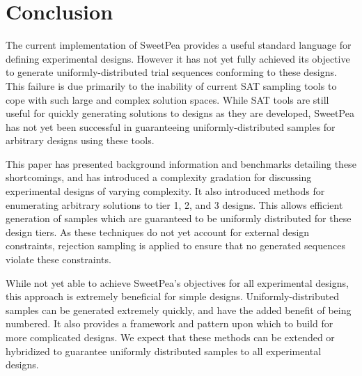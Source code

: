 
\chapter{Conclusion}

The current implementation of SweetPea provides a useful standard language for defining experimental designs. However it has not yet fully achieved its objective to generate uniformly-distributed trial sequences conforming to these designs. This failure is due primarily to the inability of current SAT sampling tools to cope with such large and complex solution spaces. While SAT tools are still useful for quickly generating solutions to designs as they are developed, SweetPea has not yet been successful in guaranteeing uniformly-distributed samples for arbitrary designs using these tools.

This paper has presented background information and benchmarks detailing these shortcomings, and has introduced a complexity gradation for discussing experimental designs of varying complexity. It also introduced methods for enumerating arbitrary solutions to tier 1, 2, and 3 designs. This allows efficient generation of samples which are guaranteed to be uniformly distributed for these design tiers. As these techniques do not yet account for external design constraints, rejection sampling is applied to ensure that no generated sequences violate these constraints.

While not yet able to achieve SweetPea's objectives for all experimental designs, this approach is extremely beneficial for simple designs. Uniformly-distributed samples can be generated extremely quickly, and have the added benefit of being numbered. It also provides a framework and pattern upon which to build for more complicated designs. We expect that these methods can be extended or hybridized to guarantee uniformly distributed samples to all experimental designs.

